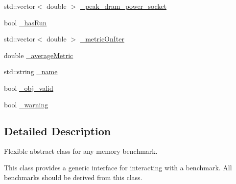 \begin{DoxyCompactItemize}
\item 
std\-::vector$<$ double $>$ \hyperlink{classxmem_1_1benchmark_1_1_benchmark_a4da600693ba1df4fb69c1304b23b2cde}{\-\_\-peak\-\_\-dram\-\_\-power\-\_\-socket}
\item 
bool \hyperlink{classxmem_1_1benchmark_1_1_benchmark_a7caa584aa404d7751b781fd16c111fd0}{\-\_\-has\-Run}
\item 
std\-::vector$<$ double $>$ \hyperlink{classxmem_1_1benchmark_1_1_benchmark_a1c3ef60ba77f151cc4d5b4b77d2deefa}{\-\_\-metric\-On\-Iter}
\item 
double \hyperlink{classxmem_1_1benchmark_1_1_benchmark_a303386b7b243e39f2ca9a041ae819162}{\-\_\-average\-Metric}
\item 
std\-::string \hyperlink{classxmem_1_1benchmark_1_1_benchmark_ab9653ef73e0f1ca01e08286bdb35e4a6}{\-\_\-name}
\item 
bool \hyperlink{classxmem_1_1benchmark_1_1_benchmark_a87e133558776380738354191ec5e6560}{\-\_\-obj\-\_\-valid}
\item 
bool \hyperlink{classxmem_1_1benchmark_1_1_benchmark_af1a72e70f81c91f7c004ae01b2353288}{\-\_\-warning}
\end{DoxyCompactItemize}


\subsection{Detailed Description}
Flexible abstract class for any memory benchmark. 

This class provides a generic interface for interacting with a benchmark. All benchmarks should be derived from this class. 

